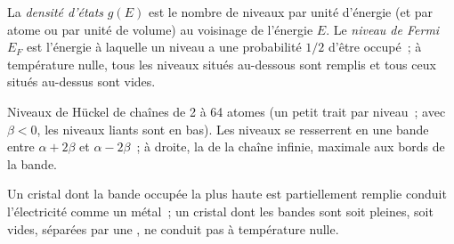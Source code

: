 \begin{definition}\label{def:b3:solid-state:fermi}
La \emph{densité d'états} $g(E)$ est le nombre de
niveaux par unité d'énergie (et par atome ou par unité de volume) au
voisinage de l'énergie $E$. Le \emph{niveau de Fermi} $E_F$ est l'énergie à laquelle un
niveau a une probabilité $1/2$ d'être occupé~; à température nulle, tous les niveaux situés au-dessous
sont remplis et tous ceux situés au-dessus sont vides.
\end{definition}

\begin{omfigure}

{\small Niveaux de Hückel de chaînes de 2 à 64 atomes (un petit trait par
niveau~; avec $\beta < 0$, les niveaux liants sont en bas). Les niveaux se resserrent en une bande
entre $\alpha + 2\beta$ et $\alpha - 2\beta$~; à droite, la  de la chaîne infinie,
maximale aux bords de la bande.}
\end{omfigure}

\begin{proposition}\label{prop:b3:solid-state:filling}
Un cristal dont la bande occupée la plus haute est partiellement remplie
conduit l'électricité comme un métal~; un cristal dont les bandes sont
soit pleines, soit vides, séparées par une , ne conduit pas
à température nulle.
\end{proposition}

